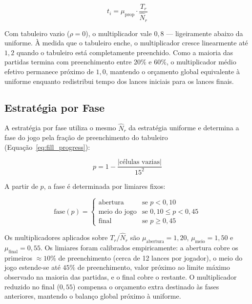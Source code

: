 \documentclass[cic,tc]{iiufrgs}
\begin{document}
\begin{equation}
    t_i = \mu_{\text{prop}} \cdot \frac{T_r}{\hat{N}_r}
\end{equation}

Com tabuleiro vazio ($\rho = 0$), o multiplicador vale $0{,}8$ — ligeiramente abaixo da uniforme. À medida que o tabuleiro enche, o multiplicador cresce linearmente até $1{,}2$ quando o tabuleiro está completamente preenchido. Como a maioria das partidas termina com preenchimento entre 20\% e 60\%, o multiplicador médio efetivo permanece próximo de $1{,}0$, mantendo o orçamento global equivalente à uniforme enquanto redistribui tempo dos lances iniciais para os lances finais.

\subsection{Estratégia por Fase}
\label{sec:impl_phase}

A estratégia por fase utiliza o mesmo $\hat{N}_r$ da estratégia uniforme e determina a fase do jogo pela fração de preenchimento do tabuleiro (Equação~\ref{eq:fill_progress}):

\begin{equation}
    p = 1 - \frac{|\text{células vazias}|}{15^2}
\label{eq:fill_progress}
\end{equation}

A partir de $p$, a fase é determinada por limiares fixos:

\begin{equation}
    \text{fase}(p) =
    \begin{cases}
        \text{abertura}       & \text{se } p < 0{,}10 \\
        \text{meio do jogo}   & \text{se } 0{,}10 \leq p < 0{,}45 \\
        \text{final}          & \text{se } p \geq 0{,}45
    \end{cases}
\end{equation}

Os multiplicadores aplicados sobre $T_r / \hat{N}_r$ são $\mu_{\text{abertura}} = 1{,}20$, $\mu_{\text{meio}} = 1{,}50$ e $\mu_{\text{final}} = 0{,}55$. Os limiares foram calibrados empiricamente: a abertura cobre os primeiros $\approx 10\%$ de preenchimento (cerca de 12 lances por jogador), o meio do jogo estende-se até $45\%$ de preenchimento, valor próximo ao limite máximo observado na maioria das partidas, e o final cobre o restante. O multiplicador reduzido no final ($0{,}55$) compensa o orçamento extra destinado às fases anteriores, mantendo o balanço global próximo à uniforme.
\end{document}
